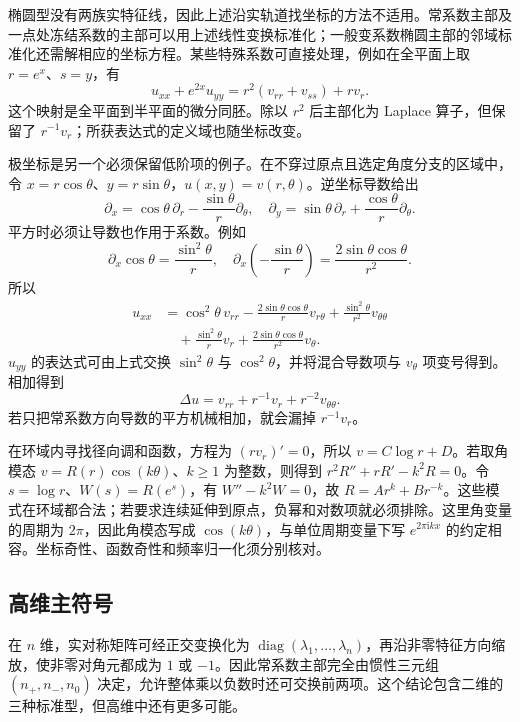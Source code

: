 椭圆型没有两族实特征线，因此上述沿实轨道找坐标的方法不适用。常系数主部及一点处冻结系数的主部可以用上述线性变换标准化；一般变系数椭圆主部的邻域标准化还需解相应的坐标方程。某些特殊系数可直接处理，例如在全平面上取 \(r=e^x\)、\(s=y\)，有
\[
 u_{xx}+e^{2x}u_{yy}=r^2(v_{rr}+v_{ss})+r v_r.
\]
这个映射是全平面到半平面的微分同胚。除以 \(r^2\) 后主部化为 Laplace 算子，但保留了 \(r^{-1}v_r\)；所获表达式的定义域也随坐标改变。

\ProseParagraphBreak

极坐标是另一个必须保留低阶项的例子。在不穿过原点且选定角度分支的区域中，令 \(x=r\cos\theta\)、\(y=r\sin\theta\)，\(u(x,y)=v(r,\theta)\)。逆坐标导数给出
\[
 \partial_x=\cos\theta\,\partial_r-\frac{\sin\theta}r\partial_\theta,
 \quad\partial_y=\sin\theta\,\partial_r+\frac{\cos\theta}r\partial_\theta.
\]
平方时必须让导数也作用于系数。例如
\[
 \partial_x\cos\theta=\frac{\sin^2\theta}r,
 \quad\partial_x\left(-\frac{\sin\theta}r\right)
 =\frac{2\sin\theta\cos\theta}{r^2}.
\]
所以
\[
 \begin{aligned}
 u_{xx}
 &=\cos^2\theta\,v_{rr}-\frac{2\sin\theta\cos\theta}r v_{r\theta}
   +\frac{\sin^2\theta}{r^2}v_{\theta\theta}\\
 &\quad+\frac{\sin^2\theta}r v_r
   +\frac{2\sin\theta\cos\theta}{r^2}v_\theta.
 \end{aligned}
\]
\(u_{yy}\) 的表达式可由上式交换 \(\sin^2\theta\) 与 \(\cos^2\theta\)，并将混合导数项与 \(v_\theta\) 项变号得到。相加得到
\begin{equation}\label{b2:eq:08-polar-laplacian}
 \Delta u=v_{rr}+r^{-1}v_r+r^{-2}v_{\theta\theta}.
\end{equation}
若只把常系数方向导数的平方机械相加，就会漏掉 \(r^{-1}v_r\)。

\ProseParagraphBreak

在环域内寻找径向调和函数，方程为 \((rv_r)'=0\)，所以 \(v=C\log r+D\)。若取角模态 \(v=R(r)\cos(k\theta)\)、\(k\geq1\) 为整数，则得到 \(r^2R''+rR'-k^2R=0\)。令 \(s=\log r\)、\(W(s)=R(e^s)\)，有 \(W''-k^2W=0\)，故 \(R=Ar^k+Br^{-k}\)。这些模式在环域都合法；若要求连续延伸到原点，负幂和对数项就必须排除。这里角变量的周期为 \(2\pi\)，因此角模态写成 \(\cos(k\theta)\)，与单位周期变量下写 \(e^{2\pi\mathrm{i}kx}\) 的约定相容。坐标奇性、函数奇性和频率归一化须分别核对。

\subsection{高维主符号}
\label{b2:subsec:080303}

在 \(n\) 维，实对称矩阵可经正交变换化为 \(\operatorname{diag}(\lambda_1,\ldots,\lambda_n)\)，再沿非零特征方向缩放，使非零对角元都成为 \(1\) 或 \(-1\)。因此常系数主部完全由惯性三元组 \((n_+,n_-,n_0)\) 决定，允许整体乘以负数时还可交换前两项。这个结论包含二维的三种标准型，但高维中还有更多可能。

